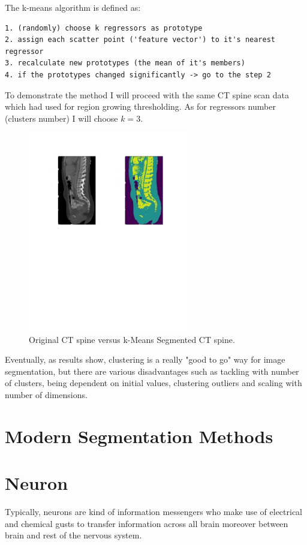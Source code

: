 The k-means algorithm is defined as:
\begin{lstlisting}
1. (randomly) choose k regressors as prototype
2. assign each scatter point ('feature vector') to it's nearest regressor
3. recalculate new prototypes (the mean of it's members)
4. if the prototypes changed significantly -> go to the step 2 
\end{lstlisting}

To demonstrate the method I will proceed with the same CT spine scan data which had used for region growing thresholding. As for regressors number (clusters number) I will choose $k=3$.  

\begin{figure}[h]
    \centering \includegraphics[width=7cm]{images/ct-spine-k-means-segmented.jpg}
    \vspace*{-50mm} \caption {Original CT spine versus k-Means Segmented CT spine.}
\end{figure}

Eventually, as results show, clustering is a really "good to go" way for image segmentation, but there are various disadvantages such as tackling with number of clusters, being dependent on initial values, clustering outliers and scaling with number of dimensions.

\section{Modern Segmentation Methods}
\section{Neuron}
Typically, neurons are kind of information messengers who make use of electrical and chemical gusts to transfer information across all brain moreover between brain and rest of the nervous system.

